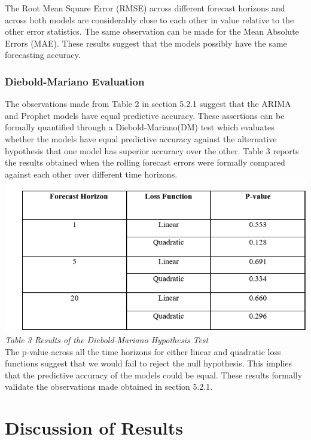 \documentclass[12pt,a4paper]{article}
\numberwithin{equation}{section}
\numberwithin{figure}{section}
\numberwithin{table}{section}
\begin{document}
The Root Mean Square Error (RMSE) across different forecast horizons and
across both models are considerably close to each other in value
relative to the other error statistics. The same observation can be made
for the Mean Absolute Errors (MAE). These results suggest that the
models possibly have the same forecasting accuracy.

\subsubsection{Diebold-Mariano
Evaluation}\label{diebold-mariano-evaluation-1}

The observations made from Table 2 in section 5.2.1 suggest that the
ARIMA and Prophet models have equal predictive accuracy. These
assertions can be formally quantified through a Diebold-Mariano(DM) test
which evaluates whether the models have equal predictive accuracy
against the alternative hypothesis that one model has superior accuracy
over the other. Table 3 reports the results obtained when the rolling
forecast errors were formally compared against each other over different
time horizons.\\
\includegraphics[width=1.05000\textwidth]{dm results.png}\\
\emph{Table 3 Results of the Diebold-Mariano Hypothesis Test}\\
The p-value across all the time horizons for either linear and quadratic
loss functions suggest that we would fail to reject the null hypothesis.
This implies that the predictive accuracy of the models could be equal.
These results formally validate the observations made obtained in
section 5.2.1.

\section{Discussion of Results}\label{discussion-of-results}
\end{document}
